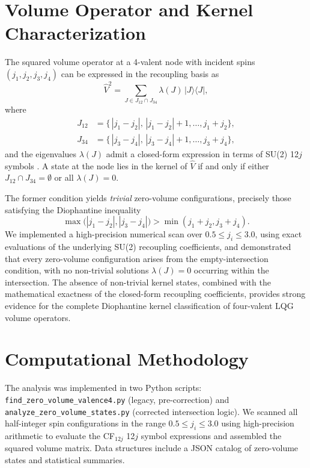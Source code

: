 \documentclass[11pt]{article}
\begin{document}
\section{Volume Operator and Kernel Characterization}
The squared volume operator at a 4-valent node with incident spins $(j_1,j_2,j_3,j_4)$ can be expressed in the recoupling basis as
\begin{equation}
\hat{V}^2 = \sum_{J\in J_{12}\cap J_{34}} \lambda(J)\,\bigl|J\bigr\rangle\bigl\langle J\bigr|,
\end{equation}
where
\begin{align}
J_{12} &= \{\,|j_1 - j_2|,\,|j_1 - j_2|+1,\dots,j_1+j_2\}, \\
J_{34} &= \{\,|j_3 - j_4|,\,|j_3 - j_4|+1,\dots,j_3+j_4\},
\end{align}
and the eigenvalues $\lambda(J)$ admit a closed-form expression in terms of SU(2) 12$j$ symbols \cite{Arcticoder2025Uniform12j}. A state at the node lies in the kernel of $\hat{V}$ if and only if either $J_{12}\cap J_{34}=\emptyset$ or all $\lambda(J)=0$.

The former condition yields \emph{trivial} zero-volume configurations, precisely those satisfying the Diophantine inequality
\begin{equation}
\max\bigl(|j_1-j_2|,|j_3-j_4|\bigr) > \min(j_1+j_2,j_3+j_4).
\end{equation}
We implemented a high-precision numerical scan over $0.5\le j_i\le3.0$, using exact evaluations of the underlying SU(2) recoupling coefficients, and demonstrated that every zero-volume configuration arises from the empty-intersection condition, with no non-trivial solutions $\lambda(J)=0$ occurring within the intersection. The absence of non-trivial kernel states, combined with the mathematical exactness of the closed-form recoupling coefficients, provides strong evidence for the complete Diophantine kernel classification of four-valent LQG volume operators.

\section{Computational Methodology}
The analysis was implemented in two Python scripts: \texttt{find_zero_volume_valence4.py} (legacy, pre-correction) and \texttt{analyze_zero_volume_states.py} (corrected intersection logic). We scanned all half-integer spin configurations in the range $0.5\le j_i\le3.0$ using high-precision arithmetic to evaluate the CF$_{12j}$ 12$j$ symbol expressions and assembled the squared volume matrix. Data structures include a JSON catalog of zero-volume states and statistical summaries.
\end{document}
